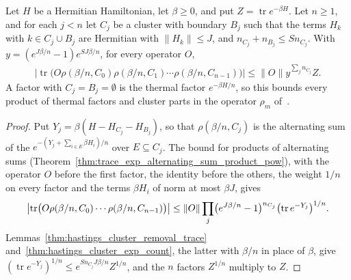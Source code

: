 \begin{lemma}
    \label{thm:hastings_cluster_part_product}
    \leanok
    Let $H$ be a Hermitian Hamiltonian, let $\beta\ge0$, and put
    $Z=\operatorname{tr}e^{-\beta H}$. Let $n\ge1$, and for each $j<n$ let $C_j$ be a
    cluster with boundary $B_j$ such that the terms $H_k$ with $k\in C_j\cup B_j$ are
    Hermitian with $\|H_k\|\le J$, and $n_{C_j}+n_{B_j}\le Sn_{C_j}$. With
    $y=(e^{J\beta/n}-1)e^{SJ\beta/n}$, for every operator $O$,
    \begin{align}
        \left|\operatorname{tr}\bigl(O\rho(\beta/n,C_0)\rho(\beta/n,C_1)\cdots
        \rho(\beta/n,C_{n-1})\bigr)\right|
        \le\|O\|y^{\sum_jn_{C_j}}Z.
        \label{eq:hastings_cluster_part_product}
    \end{align}
    A factor with $C_j=B_j=\emptyset$ is the thermal factor $e^{-\beta H/n}$, so this bounds
    every product of thermal factors and cluster parts in the operator $\rho_m$
    of~\cite[lines 1334--1341]{Hastings2006Solving}.
\end{lemma}

\begin{proof}
    \leanok
    Put $Y_j=\beta(H-H_{C_j}-H_{B_j})$, so that $\rho(\beta/n,C_j)$ is the alternating sum of
    the $e^{-(Y_j+\sum_{i\in E}\beta H_i)/n}$ over $E\subseteq C_j$. The bound for products of
    alternating sums (Theorem~\ref{thm:trace_exp_alternating_sum_product_pow}), with
    the operator $O$ before the first factor, the identity before the others, the weight $1/n$
    on every factor and the terms $\beta H_i$ of norm at most $\beta J$, gives
    \begin{align}
        \left|\operatorname{tr}\bigl(O\rho(\beta/n,C_0)\cdots\rho(\beta/n,C_{n-1})\bigr)\right|
        \le\|O\|\prod_j\bigl(e^{J\beta/n}-1\bigr)^{n_{C_j}}
        \bigl(\operatorname{tr}e^{-Y_j}\bigr)^{1/n}.\notag
    \end{align}
    Lemmas~\ref{thm:hastings_cluster_removal_trace} and~\ref{thm:hastings_cluster_exp_count},
    the latter with $\beta/n$ in place of $\beta$, give
    $(\operatorname{tr}e^{-Y_j})^{1/n}\le e^{Sn_{C_j}J\beta/n}Z^{1/n}$, and the $n$ factors
    $Z^{1/n}$ multiply to $Z$.
\end{proof}

